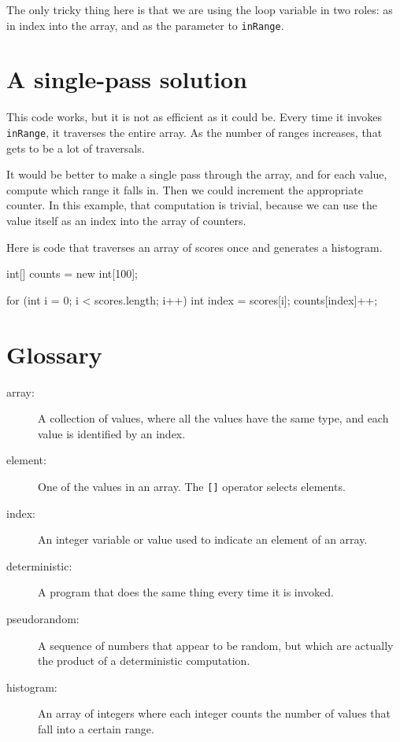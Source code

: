 The only tricky thing here is that we are using the loop variable
in two roles: as in index into the array, and as the parameter to
{\tt inRange}.


\section{A single-pass solution}
\label{singlepass}

This code works, but it is not as efficient as it could
be.  Every time it invokes {\tt inRange}, it traverses the
entire array.  As the number of ranges increases, that gets
to be a lot of traversals.

It would be better to make a single pass through the array,
and for each value, compute which range it falls in.  Then
we could increment the appropriate counter.
In this example, that computation is trivial, because we
can use the value itself as an index into the array of counters.

Here is code that traverses an array of scores once and generates
a histogram.

\begin{code}
    int[] counts = new int[100];

    for (int i = 0; i < scores.length; i++) {
        int index = scores[i];
        counts[index]++;
    }
\end{code}


\section{Glossary}

\begin{description}

\item[array:]  A collection of values, where all the
values have the same type, and each value is identified by
an index.

\item[element:]  One of the values in an array.  The {\tt []}
operator selects elements.

\item[index:]  An integer variable or value used to indicate
an element of an array.

\item[deterministic:]  A program that does the same thing every
time it is invoked.

\item[pseudorandom:]  A sequence of numbers that appear to be
random, but which are actually the product of a deterministic
computation.

\item[histogram:]  An array of integers where each integer
counts the number of values that fall into a certain range.


\end{description}


